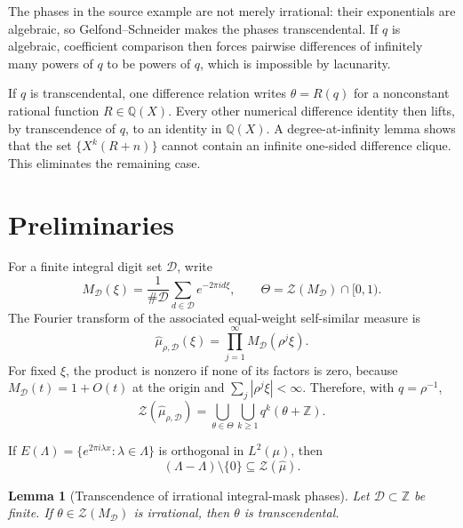 \documentclass[11pt]{article}
\newtheorem{lemma}[theorem]{Lemma}
\newcommand{\Z}{\mathbb Z}
\newcommand{\Q}{\mathbb Q}
\begin{document}
The phases in the source example are not merely irrational: their
exponentials are algebraic, so Gelfond--Schneider makes the phases
transcendental.  If $q$ is algebraic, coefficient comparison then forces
pairwise differences of infinitely many powers of $q$ to be powers of $q$,
which is impossible by lacunarity.

If $q$ is transcendental, one difference relation writes
$\theta=R(q)$ for a nonconstant rational function $R\in\Q(X)$.  Every other
numerical difference identity then lifts, by transcendence of $q$, to an
identity in $\Q(X)$.  A degree-at-infinity lemma shows that the set
$\{X^k(R+n)\}$ cannot contain an infinite one-sided difference clique.
This eliminates the remaining case.

\section{Preliminaries}

For a finite integral digit set $\mathcal D$, write
\[
 M_{\mathcal D}(\xi)=\frac1{\#\mathcal D}
   \sum_{d\in\mathcal D}e^{-2\pi i d\xi},
 \qquad
 \Theta=\mathcal Z(M_{\mathcal D})\cap[0,1).
\]
The Fourier transform of the associated equal-weight self-similar measure is
\begin{equation}\label{eq:product}
 \widehat\mu_{\rho,\mathcal D}(\xi)
   =\prod_{j=1}^{\infty}M_{\mathcal D}(\rho^j\xi).
\end{equation}
For fixed $\xi$, the product is nonzero if none of its factors is zero,
because $M_{\mathcal D}(t)=1+O(t)$ at the origin and
$\sum_j|\rho^j\xi|<\infty$.  Therefore, with $q=\rho^{-1}$,
\begin{equation}\label{eq:zeros}
 \mathcal Z(\widehat\mu_{\rho,\mathcal D})
   =\bigcup_{\theta\in\Theta}\bigcup_{k\geq1}
       q^k(\theta+\Z).
\end{equation}

If $E(\Lambda)=\{e^{2\pi i\lambda x}:\lambda\in\Lambda\}$ is
orthogonal in $L^2(\mu)$, then
\begin{equation}\label{eq:bizero}
 (\Lambda-\Lambda)\setminus\{0\}
    \subseteq\mathcal Z(\widehat\mu).
\end{equation}

\begin{lemma}[Transcendence of irrational integral-mask phases]
\label{lem:phase-trans}
Let $\mathcal D\subset\Z$ be finite.  If
$\theta\in\mathcal Z(M_{\mathcal D})$ is irrational, then $\theta$ is
transcendental.
\end{lemma}
\end{document}
